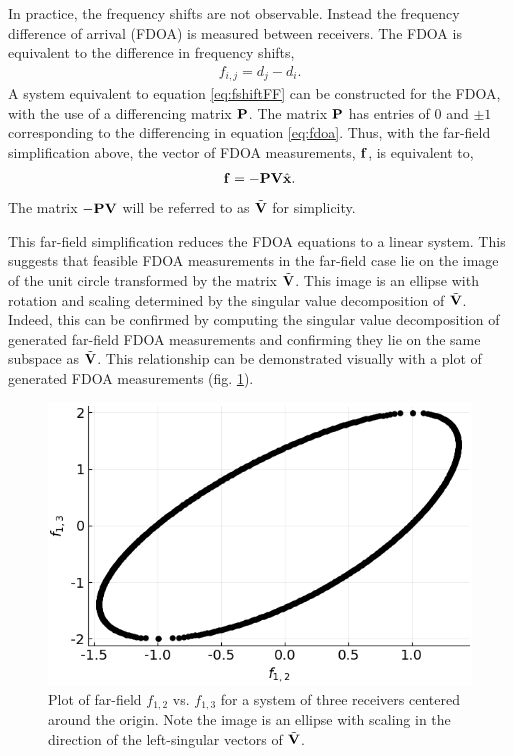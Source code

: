 In practice, the frequency shifts are not observable. Instead the frequency difference of arrival (FDOA) is measured between receivers. The FDOA is equivalent to the difference in frequency shifts,
\begin{align}
  \label{eq:fdoa}
  f_{i,j} = d_j-d_i.
\end{align}
A system equivalent to equation \ref{eq:fshiftFF} can be constructed for the FDOA, with the use of a differencing matrix $\mathbf{P}$. The matrix $\mathbf{P}$ has entries of 0 and $\pm 1$ corresponding to the differencing in equation \ref{eq:fdoa}. Thus, with the far-field simplification above, the vector of FDOA measurements, $\mathbf{f}$, is equivalent to,
\begin{align}
  \label{eq:fdoaFF}
\mathbf{f} = -\mathbf{PV}\hat{\mathbf{x}}.
\end{align}
The matrix $\mathbf{-PV}$ will be referred to as $\tilde{\mathbf{V}}$ for simplicity.

This far-field simplification reduces the FDOA equations to a linear system. This suggests that feasible FDOA measurements in the far-field case lie on the image of the unit circle transformed by the matrix $\tilde{\mathbf{V}}$. This image is an ellipse with rotation and scaling determined by the singular value decomposition of $\tilde{\mathbf{V}}$. Indeed, this can be confirmed by computing the singular value decomposition of generated far-field FDOA measurements and confirming they lie on the same subspace as $\tilde{\mathbf{V}}$. This relationship can be demonstrated visually with a plot of generated FDOA measurements (fig. \ref{f:ellipse}).

\begin{figure}[h!]
  \includegraphics[scale=0.7]{FDOAellipse.png}
  \caption{Plot of far-field $f_{1,2}$ vs. $f_{1,3}$ for a system of three receivers centered around the origin. Note the image is an ellipse with scaling in the direction of the left-singular vectors of $\tilde{\mathbf{V}}$.}
  \label{f:ellipse}
\end{figure}

